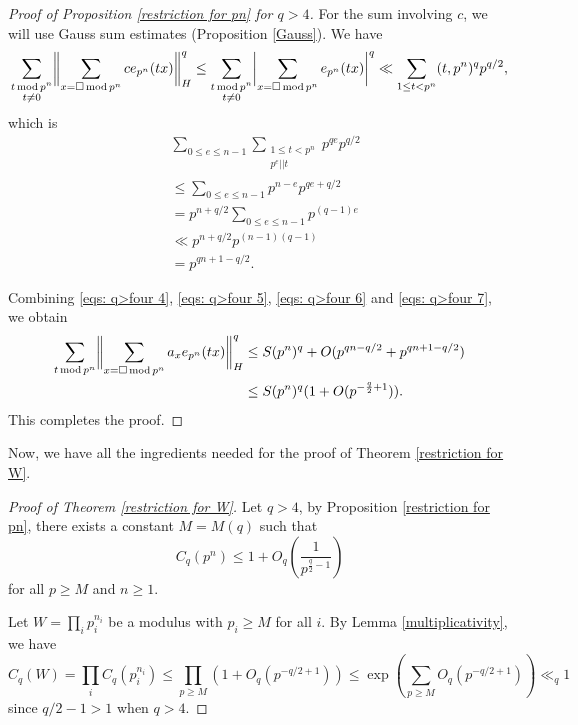 \documentclass[11pt]{amsart}
\theoremstyle{plain} %
\theoremstyle{remark}
\numberwithin{equation}{section}
\DeclarePairedDelimiter\abs{\lvert}{\rvert}
\DeclarePairedDelimiter\norm{\lVert}{\rVert}
\newcommand{\sqp}[1]{\sum_{#1=\square\,\mathrm{mod}\,p^n}}
\newcommand{\ap}[1]{\sum_{#1\,\mathrm{mod}\,p^n}}
\begin{document}
\begin{proof}[Proof of Proposition \ref{restriction for pn} for $q>4$]
    For the sum involving $c$, we will use Gauss sum estimates (Proposition \ref{Gauss}). We have
    \begin{equation}\label{eqs: q>four 6}
        \sum_{\substack{t\,\mathrm{mod}\,p^n\\t\neq 0}} \norm[\bigg]{\sqp{x}ce_{p^n}(tx)}_H^q
        \leq \sum_{\substack{t\,\mathrm{mod}\,p^n\\t\neq 0}} \abs[\bigg]{\sqp{x}e_{p^n}(tx)}^q
        \ll \sum_{1\leq t< p^n} (t,p^n)^q p^{q/2},
    \end{equation}
    which is
    \begin{equation}\label{eqs: q>four 7}
    \begin{split}
        &\sum_{0\leq e\leq n-1}\sum_{\substack{1\leq t<p^n\\p^e||t}}p^{qe}p^{q/2}\\
        &\leq \sum_{0\leq e\leq n-1}p^{n-e}p^{qe+q/2}\\
        &=p^{n+q/2}\sum_{0\leq e\leq n-1}p^{(q-1)e}\\
        &\ll p^{n+q/2}p^{(n-1)(q-1)}\\
        &=p^{qn+1-q/2}.
    \end{split}        
    \end{equation}

    Combining \eqref{eqs: q>four 4}, \eqref{eqs: q>four 5}, \eqref{eqs: q>four 6} and \eqref{eqs: q>four 7}, we obtain
    \begin{equation*}
        \begin{split}
            \ap{t} \norm[\bigg]{\sqp{x}a_xe_{p^n}(tx)}_H^q&\leq S(p^n)^q+O(p^{qn-q/2}+p^{qn+1-q/2})\\
            &\leq S(p^n)^q(1+O(p^{-\frac{q}{2}+1})).
        \end{split}
    \end{equation*}
    This completes the proof.
\end{proof}

Now, we have all the ingredients needed for the proof of Theorem \ref{restriction for W}.

\begin{proof}[Proof of Theorem \ref{restriction for W}]
    Let $q>4$, by Proposition \ref{restriction for pn}, there exists a constant $M=M(q)$ such that
    \begin{equation*}
        C_q(p^n)\leq 1+O_q \left( \frac{1}{p^{\frac{q}{2}-1}} \right)
    \end{equation*}
    for all $p\geq M$ and $n\geq 1$.

    Let $W=\prod_i p_i^{n_i}$ be a modulus with $p_i\geq M$ for all $i$. By Lemma \ref{multiplicativity}, we have
    \begin{equation*}
        C_q(W)=\prod_i C_q(p_i^{n_i})\leq \prod_{p\geq M}(1+O_q(p^{-q/2+1}))\leq \exp\left(\sum_{p\geq M}O_q(p^{-q/2+1})\right)\ll_q 1
    \end{equation*}
    since $q/2-1>1$ when $q>4$.
\end{proof}
\end{document}
